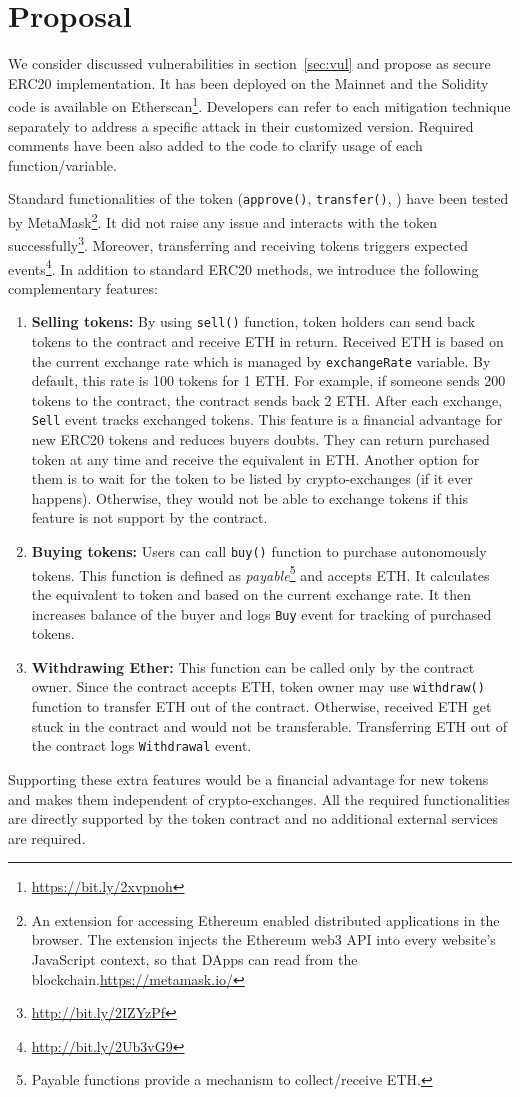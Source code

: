 
\section{Proposal}\label{sec:proposal}
We consider discussed vulnerabilities in section~\ref{sec:vul} and propose as secure ERC20 implementation. It has been deployed on the Mainnet and the Solidity code is available on Etherscan\footnote{\url{https://bit.ly/2xvpnoh}}. Developers can refer to each mitigation technique separately to address a specific attack in their customized version. Required comments have been also added to the code to clarify usage of each function/variable.

Standard functionalities of the token (\ie \texttt{approve()}, \texttt{transfer()}, \etc) have been tested by MetaMask\footnote{An extension for accessing Ethereum enabled distributed applications in the browser. The extension injects the Ethereum web3 API into every website's JavaScript context, so that DApps can read from the blockchain.\url{https://metamask.io/}}. It did not raise any issue and interacts with the token successfully\footnote{\url{http://bit.ly/2IZYzPf}}. Moreover, transferring and receiving tokens triggers expected events\footnote{\url{http://bit.ly/2Ub3vG9}}. In addition to standard ERC20 methods, we introduce the following complementary features:

\begin{enumerate}[leftmargin=*]
	\item \textbf{Selling tokens:} By using \texttt{sell()} function, token holders can send back tokens to the contract and receive ETH in return. Received ETH is based on the current exchange rate which is managed by \texttt{exchangeRate} variable. By default, this rate is 100 tokens for 1 ETH. For example, if someone sends 200 tokens to the contract, the contract sends back 2 ETH. After each exchange, \texttt{Sell} event tracks exchanged tokens. This feature is a financial advantage for new ERC20 tokens and reduces buyers doubts. They can return purchased token at any time and receive the equivalent in ETH. Another option for them is to wait for the token to be listed by crypto-exchanges (if it ever happens). Otherwise, they would not be able to exchange tokens if this feature is not support by the contract.
	\item \textbf{Buying tokens:} Users can call \texttt{buy()} function to purchase autonomously tokens. This function is defined as \textit{payable}\footnote{Payable functions provide a mechanism to collect/receive ETH.} and accepts ETH. It calculates the equivalent to token and based on the current exchange rate. It then increases balance of the buyer and logs \texttt{Buy} event for tracking of purchased tokens.
	\item \textbf{Withdrawing Ether:} This function can be called only by the contract owner. Since the contract accepts ETH, token owner may use \texttt{withdraw()} function to transfer ETH out of the contract. Otherwise, received ETH get stuck in the contract and would not be transferable. Transferring ETH out of the contract logs \texttt{Withdrawal} event.
\end{enumerate}

\noindent Supporting these extra features would be a financial advantage for new tokens and makes them independent of crypto-exchanges. All the required functionalities are directly supported by the token contract and no additional external services are required.